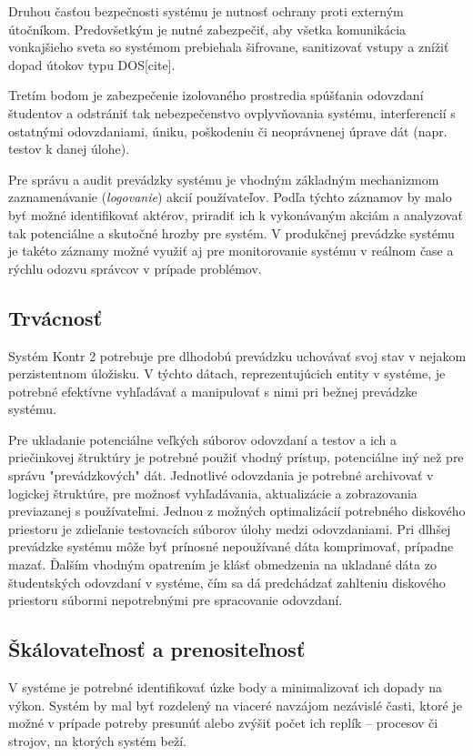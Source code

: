 \documentclass[
  digital, %
  twoside, %
  table,   %
  lof,     %
  lot,     %
]{fithesis3}
\begin{document}
Druhou časťou bezpečnosti systému je nutnosť ochrany proti externým útočníkom. Predovšetkým je nutné zabezpečiť, aby všetka komunikácia vonkajšieho sveta so systémom prebiehala šifrovane, sanitizovať vstupy a znížiť dopad útokov typu DOS[cite].  

Tretím bodom je zabezpečenie izolovaného prostredia spúšťania odovzdaní študentov a odstrániť tak nebezpečenstvo ovplyvňovania systému, interferencií s ostatnými odovzdaniami, úniku, poškodeniu či neoprávnenej úprave dát (napr. testov k danej úlohe).   

Pre správu a audit prevádzky systému je vhodným základným mechanizmom zaznamenávanie (\emph{logovanie}) akcií používateľov. Podľa týchto záznamov by malo byť možné identifikovať aktérov, priradiť ich k vykonávaným akciám a analyzovať tak potenciálne a skutočné hrozby pre systém. V produkčnej prevádzke systému je takéto záznamy možné využiť aj pre monitorovanie systému v reálnom čase a rýchlu odozvu správcov v prípade problémov.

\subsection{Trvácnosť}
Systém Kontr 2 potrebuje pre dlhodobú prevádzku uchovávať svoj stav v nejakom perzistentnom úložisku. V týchto dátach, reprezentujúcich entity v systéme, je potrebné efektívne vyhľadávať a manipulovať s nimi pri bežnej prevádzke systému. 

Pre ukladanie potenciálne veľkých súborov odovzdaní a testov a ich a priečinkovej štruktúry je potrebné použiť vhodný prístup, potenciálne iný než pre správu "prevádzkových" dát. Jednotlivé odovzdania je potrebné archivovať v logickej štruktúre, pre možnosť vyhľadávania, aktualizácie a zobrazovania previazanej s používateľmi. Jednou z možných optimalizácií potrebného diskového priestoru je zdieľanie testovacích súborov úlohy medzi odovzdaniami. Pri dlhšej prevádzke systému môže byť prínosné nepoužívané dáta komprimovať, prípadne mazať. Ďalším vhodným opatrením je klásť obmedzenia na ukladané dáta zo študentských odovzdaní v systéme, čím sa dá predchádzať zahlteniu diskového priestoru súbormi nepotrebnými pre spracovanie odovzdaní.

\subsection{Škálovateľnosť a prenositeľnosť}

V systéme je potrebné identifikovať úzke body a minimalizovať ich dopady na výkon. Systém by mal byť rozdelený na viaceré navzájom nezávislé časti, ktoré je možné v prípade potreby presunúť alebo zvýšiť počet ich replík -- procesov či strojov, na ktorých systém beží. 
\end{document}
